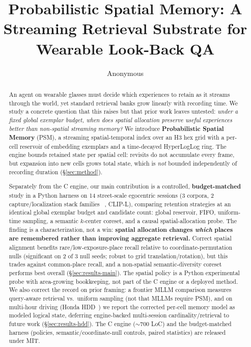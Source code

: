\documentclass[runningheads]{llncs}
\title{Probabilistic Spatial Memory: A Streaming Retrieval Substrate
for Wearable Look-Back QA}
\author{Anonymous}
\institute{Anonymous Institution\\\email{anon@example.com}}
\newcommand{\psm}{\textsc{PSM}\xspace}
\begin{document}
\maketitle

\begin{abstract}
An agent on wearable glasses must decide which experiences to retain as it
streams through the world, yet standard retrieval banks grow linearly with
recording time. We study a concrete question that this raises but that prior
work leaves untested: \emph{under a fixed global exemplar budget, when does
spatial allocation preserve useful experiences better than non-spatial
streaming memory?} We introduce \textbf{Probabilistic Spatial Memory} (\psm), a
streaming spatial-temporal index over an H3 hex grid with a per-cell
reservoir of embedding exemplars and a time-decayed HyperLogLog ring. The engine
bounds retained state per spatial cell: revisits do not accumulate every frame,
but expansion into new cells grows total state, which is \emph{not} bounded
independently of recording duration (\S\ref{sec:method}).

Separately from the C engine, our main contribution is a controlled,
\textbf{budget-matched} study in a Python harness on 14 street-scale egocentric
sessions (3 corpora, 2 capture/localization stack families
~\cite{dai2023sloper4d,pan2025lookout}, CLIP-L), comparing retention strategies
at an identical global exemplar budget and candidate count: global
reservoir, FIFO, uniform-time sampling, a semantic $k$-center coreset, and a
causal spatial-allocation probe. The finding is a characterization, not a win:
\textbf{spatial allocation changes \emph{which} places are remembered rather
than improving aggregate retrieval.} Correct spatial alignment benefits
rare/low-exposure-place recall relative to coordinate-permutation nulls
(significant on 2 of 3 null seeds; robust to grid translation/rotation), but
this trades against common-place recall, and a non-spatial semantic-diversity
coreset performs best overall (\S\ref{sec:results-main}). The spatial policy is
a Python experimental probe with area-growing bookkeeping, not part of the C
engine or a deployed method. We
also correct the record on prior framing: a frontier MLLM comparison measures
query-aware retrieval vs.\ uniform sampling (not that MLLMs require \psm), and
on multi-hour driving (Honda HDD~\cite{ramanishka2018hdd}) we report the
corrected per-cell memory model as modeled logical state, deferring
engine-backed multi-session cardinality/retrieval to future work
(\S\ref{sec:results-hdd}). The C engine ($\sim$700 LoC) and the budget-matched
harness (policies, semantic/coordinate-null controls, paired statistics) are
released under MIT.

\end{abstract}
\end{document}
